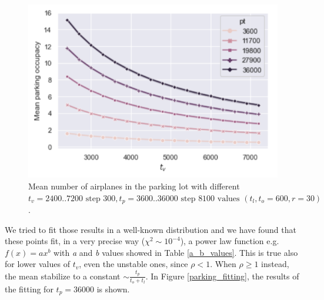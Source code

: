 \documentclass[12pt]{article}
\begin{document}
\begin{figure}[H]
	\centering
	\includegraphics[width=.8\textwidth]{report/immagini/parking_dimensioning}
	\caption{Mean number of airplanes in the parking lot with different $t_v = 2400..7200 \text{ step } 300, t_p = 3600..36000 \text{ step } 8100 \text{ values } (t_l, t_o = 600, r = 30)$.}
	\label{parking_dimensioning}
\end{figure}

We tried to fit those results in a well-known distribution and we have found that these points fit, in a very precise way ($\chi^2 \sim 10^{-4}$), a power law function e.g. $f(x)=ax^b$ with \textit{a} and \textit{b} values showed in Table \ref{a_b_values}. 
This is true also for lower values of $t_v$, even the unstable ones, since $\rho < 1$. When $\rho \geq 1$ instead, the mean stabilize to a constant $\sim \frac{t_p}{t_o + t_l}$.
In Figure \ref{parking_fitting}, the results of the fitting for $t_p=36000$ is shown.
\end{document}
